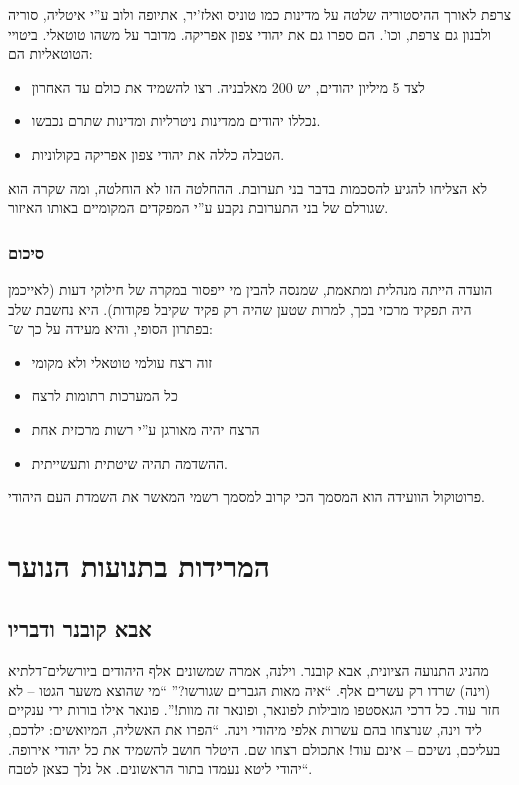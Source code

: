 \documentclass[]{article}
\theoremstyle{definition}
\begin{document}
	צרפת לאורך ההיסטוריה שלטה על מדינות כמו טוניס ואלז'יר, אתיופה ולוב ע''י איטליה, סוריה ולבנון גם צרפת, וכו'. הם ספרו גם את יהודי צפון אפריקה. מדובר על משהו טוטאלי. ביטויי הטוטאליות הם: 
	\begin{itemize}
		\item לצד 5 מיליון יהודים, יש 200 מאלבניה. רצו להשמיד את כולם עד האחרון
		\item נכללו יהודים ממדינות ניטרליות ומדינות שתרם נכבשו. 
		\item הטבלה כללה את יהודי צפון אפריקה בקולוניות. 
	\end{itemize}
	
	לא הצליחו להגיע להסכמות בדבר בני תערובת. ההחלטה הזו לא הוחלטה, ומה שקרה הוא שגורלם של בני התערובת נקבע ע''י המפקדים המקומיים באותו האיזור. 
	
	\subsubsection{סיכום}
	הועדה הייתה מנהלית ומתאמת, שמנסה להבין מי ייפסור במקרה של חילוקי דעות (לאייכמן היה תפקיד מרכזי בכך, למרות שטען שהיה רק פקיד שקיבל פקודות). היא נחשבת שלב בפתרון הסופי, והיא מעידה על כך ש־: 
	\begin{itemize}
		\item זוה רצח עולמי טוטאלי ולא מקומי
		\item כל המערכות רתומות לרצח
		\item הרצח יהיה מאורגן ע''י רשות מרכזית אחת
		\item ההשדמה תהיה שיטתית ותעשייתית. 
	\end{itemize}
	
	פרוטוקול הוועידה הוא המסמך הכי קרוב למסמך רשמי המאשר את השמדת העם היהודי. 
	
	\section{המרידות בתנועות הנוער}
	\subsection{אבא קובנר ודבריו}
	מהניג התנועה הציונית, אבא קובנר. וילנה, אמרה שמשונים אלף היהודים ביורשלים־דלתיא (וינה) שרדו רק עשרים אלף. ``איה מאות הגברים שגורשו?'' ``מי שהוצא משער הגטו – לא חזר עוד. כל דרכי הגאסטפו מובילות לפונאר, ופונאר זה מוות!''. פונאר אילו בורות ירי ענקיים ליד וינה, שנרצחו בהם עשרות אלפי מיהודי וינה. ``הפרו את האשליה, המיואשים: ילדכם, בעליכם, נשיכם – אינם עוד! אתכולם רצחו שם. היטלר חושב להשמיד את כל יהודי אירופה. יהודי ליטא נעמדו בתור הראשונים. אל נלך כצאן לטבח``. 
	
\end{document}
